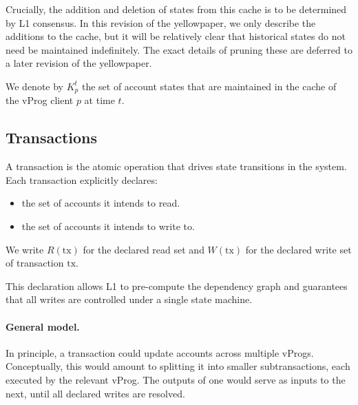 \documentclass[onecolumn, 9pt, a4paper]{extarticle}
\begin{document}
Crucially, the addition and deletion of states from this cache is to be determined by L1 consensus. In this
revision of the yellowpaper, we only describe the additions to the cache, but it will be relatively clear that
historical states do not need be maintained indefinitely. The exact details of pruning these are deferred to a later
revision of the yellowpaper. 

We denote by $K^t_p$ the set of account states that are maintained in the cache of the vProg client $p$ at time $t$.

\subsection{Transactions}\label{sec:tx}
A transaction is the atomic operation that drives state transitions in the system. Each transaction explicitly
declares:
\begin{itemize}[nosep]
  \item the set of accounts it intends to read.
  \item the set of accounts it intends to write to.
\end{itemize}
We write \(R(\mathrm{tx})\) for the declared read set and \(W(\mathrm{tx})\) for the declared write set of transaction \(\mathrm{tx}\).

This declaration allows L1 to pre-compute the dependency graph and guarantees that all writes are controlled
under a single state machine.

\paragraph{General model.} In principle, a transaction could update accounts across multiple vProgs. Conceptually, this
would amount to splitting it into smaller subtransactions, each executed by the relevant vProg. The outputs of
one would serve as inputs to the next, until all declared writes are resolved.
\end{document}
